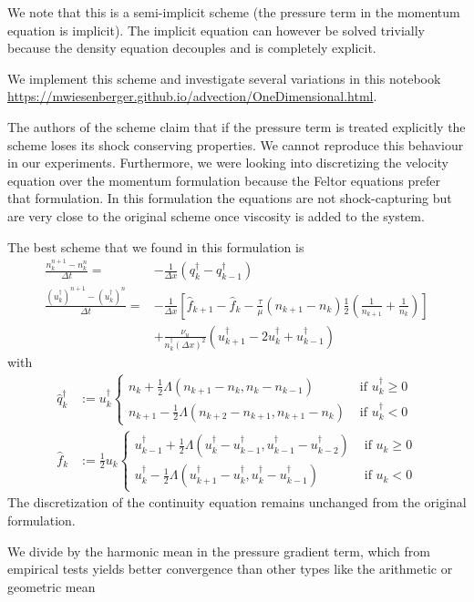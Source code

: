 We note that this is a semi-implicit scheme (the pressure term in the momentum equation is implicit). The implicit equation can however be solved trivially because
the density equation decouples and is completely explicit.

We implement this scheme and investigate several variations in this notebook
\url{https://mwiesenberger.github.io/advection/OneDimensional.html}.

The authors of the scheme claim that if the pressure term is treated explicitly the
scheme loses its shock conserving properties. We cannot reproduce this behaviour
in our experiments. Furthermore, we were looking into discretizing the
velocity equation over the momentum formulation because the Feltor equations
prefer that formulation. In this formulation the equations are not shock-capturing
but are very close to the original scheme once viscosity is added to the system.

The best scheme that we found in this formulation is
\begin{align}
    \frac{n_k^{n+1} - n_k^n}{\Delta t} = &- \frac{1}{\Delta x}(q^\dagger_k  - q^\dagger_{k-1}) \\
    \frac{(u_k^\dagger)^{n+1}-(u_k^\dagger)^{n}}{\Delta t} = &- \frac{1}{\Delta
    x} \left[ \hat f_{k+1} -\hat f_k -
        \frac{\tau}{\mu} \left(n_{k+1} - n_k\right) \frac{1}{2}\left(\frac{1}{n_{k+1}}
    +\frac{1}{n_k}\right)\right]
    \nonumber\\
    &+ \frac{\nu_u}{n^\dagger_k (\Delta x)^2}
    \left(u^\dagger_{k+1} - 2 u^\dagger_k + u^\dagger_{k-1}\right)
\end{align}
with
\begin{align}
    \hat q^\dagger_k &:= u^\dagger_k \begin{cases}
        n_k     + \frac{1}{2}\Lambda( n_{k+1}-n_k    , n_k - n_{k-1})&\text{ if } u^\dagger_k \geq 0 \\
        n_{k+1} - \frac{1}{2}\Lambda( n_{k+2}-n_{k+1}, n_{k+1} - n_k)&\text{ if } u^\dagger_k < 0
    \end{cases}
    \\
    \hat f_k &:= \frac{1}{2}u_k \begin{cases}
        u^\dagger_{k-1} + \frac{1}{2}\Lambda( u^\dagger_{k}-u^\dagger_{k-1}, u^\dagger_{k-1} - u^\dagger_{k-2})&\text{ if } u_k \geq 0 \\
        u^\dagger_k     - \frac{1}{2}\Lambda( u^\dagger_{k+1}-u^\dagger_k    , u^\dagger_k - u^\dagger_{k-1})&\text{ if } u_k < 0
    \end{cases}
\end{align}
The discretization of the continuity equation remains unchanged from the original formulation.
\begin{tcolorbox}[title=Note]
    We divide by the harmonic mean in the pressure gradient term, which from empirical tests
    yields better convergence than other types like the arithmetic
    or geometric mean
\end{tcolorbox}
